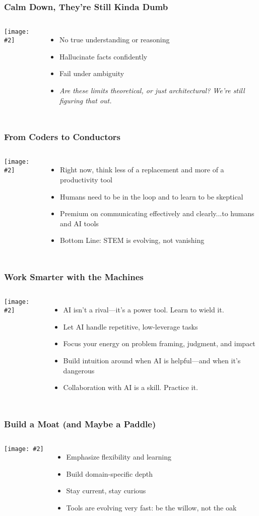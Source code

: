 \documentclass{beamer}
\newcommand{\slidewithimage}[3]{%
  \begin{frame}
    \frametitle{#1}
    \begin{columns}
      \column{0.5\textwidth}
        \texttt{[image: \#2]}\\[1em]
      \column{0.5\textwidth}
        #3
    \end{columns}
  \end{frame}
}
\begin{document}
\slidewithimage{Calm Down, They’re Still Kinda Dumb}{limitations-image.png}{
  \begin{itemize}
    \item No true understanding or reasoning
    \item Hallucinate facts confidently
    \item Fail under ambiguity
    \item \textit{Are these limits theoretical, or just architectural? We're still figuring that out.}
  \end{itemize}
}

\slidewithimage{From Coders to Conductors}{roles-image.png}{
  \begin{itemize}
    \item Right now, think less of a replacement and more of a productivity tool
    \item Humans need to be in the loop and to learn to be skeptical
    \item Premium on communicating effectively and clearly...to humans and AI tools
    \item Bottom Line: STEM is evolving, not vanishing
  \end{itemize}
}

\slidewithimage{Work Smarter with the Machines}{coexist-image.png}{
  \begin{itemize}
    \item AI isn't a rival—it's a power tool. Learn to wield it.
    \item Let AI handle repetitive, low-leverage tasks
    \item Focus your energy on problem framing, judgment, and impact
    \item Build intuition around when AI is helpful—and when it’s dangerous
    \item Collaboration with AI is a skill. Practice it.
  \end{itemize}
}

\slidewithimage{Build a Moat (and Maybe a Paddle)}{career-image.png}{
  \begin{itemize}
    \item Emphasize flexibility and learning
    \item Build domain-specific depth
    \item Stay current, stay curious
    \item Tools are evolving very fast: be the willow, not the oak
  \end{itemize}
}
\end{document}
